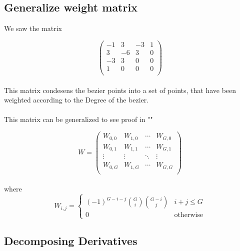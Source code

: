 \subsection{Generalize weight matrix}

We saw the matrix

\begin{equation*}
    \left(
    \begin{array}{cccc}
        -1 & 3  & -3 & 1 \\
        3  & -6 & 3  & 0 \\
        -3 & 3  & 0  & 0 \\
        1  & 0  & 0  & 0 \\
    \end{array}
    \right)
\end{equation*}
\\
This matrix condesens the bezier points into a set of points, that have been weighted according to the Degree of the bezier.
\\
\\
This matrix can be generalized to see proof in ""

\begin{equation*}
    W=
    \left(
    \begin{array}{cccc}
        W_{0,0} & W_{1,0} & \cdots & W_{G,0} \\
        W_{0,1} & W_{1,1} & \cdots & W_{G,1} \\
        \vdots  & \vdots  & \ddots & \vdots  \\
        W_{0,G} & W_{1,G} & \cdots & W_{G,G} \\
    \end{array}
    \right)
\end{equation*}
\\
where
\\
\begin{equation*}
    W_{i,j}=\begin{cases}
        (-1)^{G-i-j} {G \choose i}{G-i \choose j} & i + j \le G      \\
        0                                            & \text{otherwise}
    \end{cases}
\end{equation*}

\subsection{Decomposing Derivatives}

